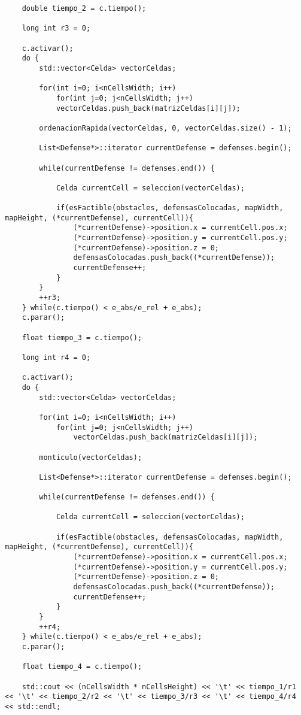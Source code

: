 \begin{lstlisting}
    double tiempo_2 = c.tiempo();

    long int r3 = 0;
    
    c.activar();
    do {
    	std::vector<Celda> vectorCeldas;
    
		for(int i=0; i<nCellsWidth; i++)
			for(int j=0; j<nCellsWidth; j++)
			vectorCeldas.push_back(matrizCeldas[i][j]);
    	
    	ordenacionRapida(vectorCeldas, 0, vectorCeldas.size() - 1);
    	
		List<Defense*>::iterator currentDefense = defenses.begin();
		
		while(currentDefense != defenses.end()) {
			
			Celda currentCell = seleccion(vectorCeldas);
			
			if(esFactible(obstacles, defensasColocadas, mapWidth, mapHeight, (*currentDefense), currentCell)){
				(*currentDefense)->position.x = currentCell.pos.x;
				(*currentDefense)->position.y = currentCell.pos.y;
				(*currentDefense)->position.z = 0; 
			    defensasColocadas.push_back((*currentDefense));
				currentDefense++;
			}
		}
		++r3;
    } while(c.tiempo() < e_abs/e_rel + e_abs);
    c.parar();
    
    float tiempo_3 = c.tiempo();
   
    long int r4 = 0;
    
    c.activar();
    do {	
		std::vector<Celda> vectorCeldas;
		
		for(int i=0; i<nCellsWidth; i++)
			for(int j=0; j<nCellsWidth; j++)
				vectorCeldas.push_back(matrizCeldas[i][j]);
				
		monticulo(vectorCeldas);
		
		List<Defense*>::iterator currentDefense = defenses.begin();
		
		while(currentDefense != defenses.end()) {
			
			Celda currentCell = seleccion(vectorCeldas);
			
			if(esFactible(obstacles, defensasColocadas, mapWidth, mapHeight, (*currentDefense), currentCell)){
				(*currentDefense)->position.x = currentCell.pos.x;
				(*currentDefense)->position.y = currentCell.pos.y;
				(*currentDefense)->position.z = 0; 
			    defensasColocadas.push_back((*currentDefense));
				currentDefense++;
			}
		}
		++r4;
    } while(c.tiempo() < e_abs/e_rel + e_abs);
    c.parar(); 
    
    float tiempo_4 = c.tiempo();
    
    std::cout << (nCellsWidth * nCellsHeight) << '\t' << tiempo_1/r1 << '\t' << tiempo_2/r2 << '\t' << tiempo_3/r3 << '\t' << tiempo_4/r4 << std::endl;
\end{lstlisting}
